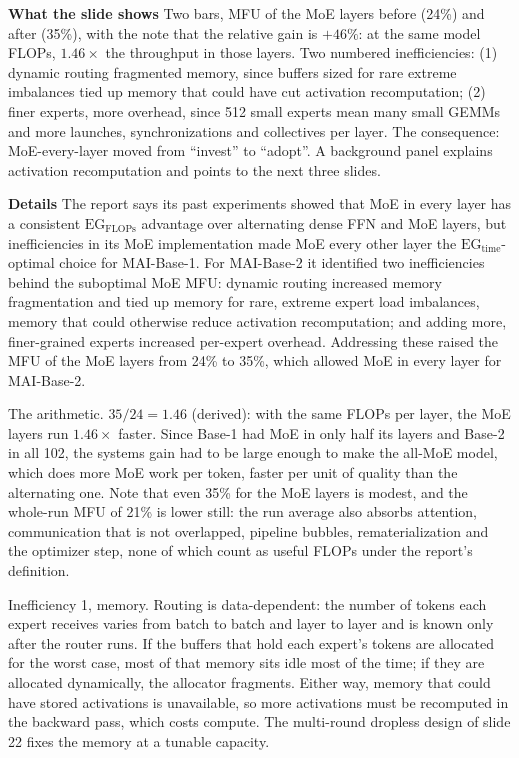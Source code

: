 \documentclass[11pt,letterpaper]{article}
\newcommand{\para}[1]{\medskip\noindent\textbf{#1}\quad}
\begin{document}
\para{What the slide shows} Two bars, MFU of the MoE layers before (24\%) and after (35\%), with the note that the relative gain is $+46\%$: at the same model FLOPs, $1.46\times$ the throughput in those layers. Two numbered inefficiencies: (1) dynamic routing fragmented memory, since buffers sized for rare extreme imbalances tied up memory that could have cut activation recomputation; (2) finer experts, more overhead, since 512 small experts mean many small GEMMs and more launches, synchronizations and collectives per layer. The consequence: MoE-every-layer moved from ``invest'' to ``adopt''. A background panel explains activation recomputation and points to the next three slides.

\para{Details} The report says its past experiments showed that MoE in every layer has a consistent $\text{EG}_{\text{FLOPs}}$ advantage over alternating dense FFN and MoE layers, but inefficiencies in its MoE implementation made MoE every other layer the $\text{EG}_{\text{time}}$-optimal choice for MAI-Base-1. For MAI-Base-2 it identified two inefficiencies behind the suboptimal MoE MFU: dynamic routing increased memory fragmentation and tied up memory for rare, extreme expert load imbalances, memory that could otherwise reduce activation recomputation; and adding more, finer-grained experts increased per-expert overhead. Addressing these raised the MFU of the MoE layers from 24\% to 35\%, which allowed MoE in every layer for MAI-Base-2.

The arithmetic. $35/24=1.46$ (derived): with the same FLOPs per layer, the MoE layers run $1.46\times$ faster. Since Base-1 had MoE in only half its layers and Base-2 in all 102, the systems gain had to be large enough to make the all-MoE model, which does more MoE work per token, faster per unit of quality than the alternating one. Note that even 35\% for the MoE layers is modest, and the whole-run MFU of 21\% is lower still: the run average also absorbs attention, communication that is not overlapped, pipeline bubbles, rematerialization and the optimizer step, none of which count as useful FLOPs under the report's definition.

Inefficiency 1, memory. Routing is data-dependent: the number of tokens each expert receives varies from batch to batch and layer to layer and is known only after the router runs. If the buffers that hold each expert's tokens are allocated for the worst case, most of that memory sits idle most of the time; if they are allocated dynamically, the allocator fragments. Either way, memory that could have stored activations is unavailable, so more activations must be recomputed in the backward pass, which costs compute. The multi-round dropless design of slide 22 fixes the memory at a tunable capacity.
\end{document}
